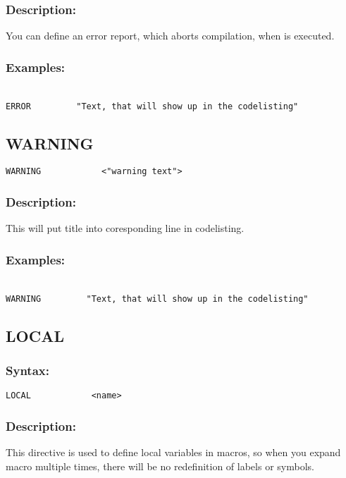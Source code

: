 {        \subsubsection{Description:}
        You can define an error report, which aborts compilation, when is executed.
        
        \subsubsection{Examples:}
            {
                ~\\
                \usecodefont
                \verb'ERROR         "Text, that will show up in the codelisting"'
            }

    \subsection{WARNING}
            \verb'WARNING            <"warning text">'
            
        \subsubsection{Description:}
            This will put title into coresponding line in codelisting.
            
        \subsubsection{Examples:}
            {
                ~\\
                \usecodefont
                \verb'WARNING         "Text, that will show up in the codelisting"'
            }

    \subsection{LOCAL}
        \subsubsection{Syntax:}
            \verb'LOCAL            <name>'

        \subsubsection{Description:}
            This directive is used to define local variables in macros, so when you expand macro multiple times, there will be no redefinition of labels or symbols.

}
